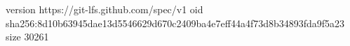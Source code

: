 version https://git-lfs.github.com/spec/v1
oid sha256:8d10b63945dae13d5546629d670c2409ba4e7eff44a4f73d8b34893fda9f5a23
size 30261
